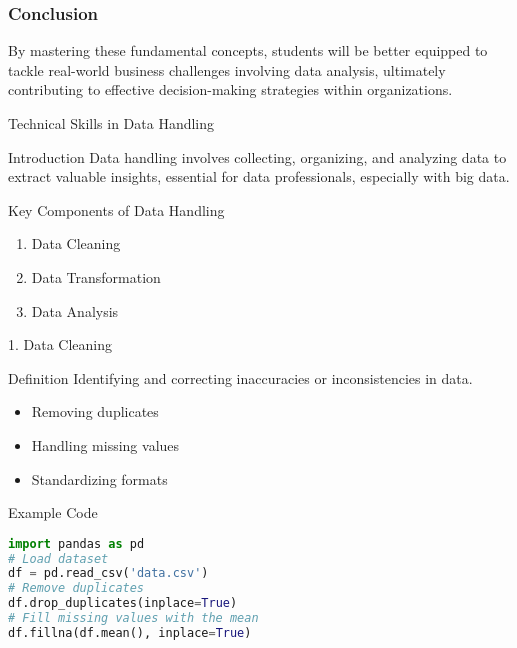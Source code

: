 \documentclass[aspectratio=169]{beamer}
\begin{document}
\begin{frame}[fragile]
    \frametitle{Conclusion}
    By mastering these fundamental concepts, students will be better equipped to tackle real-world business challenges involving data analysis, ultimately contributing to effective decision-making strategies within organizations.
\end{frame}

\begin{frame}{Technical Skills in Data Handling}
    \begin{block}{Introduction}
        Data handling involves collecting, organizing, and analyzing data to extract valuable insights, essential for data professionals, especially with big data.
    \end{block}
\end{frame}

\begin{frame}{Key Components of Data Handling}
    \begin{enumerate}
        \item Data Cleaning
        \item Data Transformation
        \item Data Analysis
    \end{enumerate}
\end{frame}

\begin{frame}[fragile]{1. Data Cleaning}
    \begin{block}{Definition}
        Identifying and correcting inaccuracies or inconsistencies in data.
    \end{block}
    \begin{itemize}
        \item Removing duplicates
        \item Handling missing values
        \item Standardizing formats
    \end{itemize}
    \begin{block}{Example Code}
    \begin{lstlisting}[language=Python]
import pandas as pd
# Load dataset
df = pd.read_csv('data.csv')
# Remove duplicates
df.drop_duplicates(inplace=True)
# Fill missing values with the mean
df.fillna(df.mean(), inplace=True)
    \end{lstlisting}
    \end{block}
\end{frame}
\end{document}
